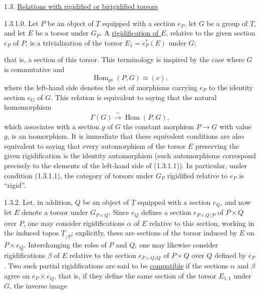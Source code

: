 
1.3. \underline{Relations with rigidified or birigidified torsors}

1.3.1.0. Let $P$ be an object of $\underline T$ equipped with a section
$e_P$, let $G$ be a group of $\underline T$, and let $E$ be a torsor
under $G_P$. A \underline{rigidification of $E$}, relative to the given
section $e_P$ of $P$, is a trivialization of the torsor
$E_1=e_P^*(E)$ under $G$;


that is, a section of this torsor. This terminology is inspired by the
case where $G$ is commutative and
\begin{equation}\tag{1.3.1.1}
 \operatorname{Hom}_{\mathrm{pt}}(P,G)\simeq(e),
\end{equation}
where the left-hand side denotes the set of morphisms carrying $e_P$ to
the identity section $e_G$ of $G$. This relation is equivalent to saying
that the natural homomorphism
\begin{equation}\tag{1.3.1.2}
 \Gamma(G)\xrightarrow{\ \sim\ }\operatorname{Hom}(P,G),
\end{equation}
which associates with a section $g$ of $G$ the constant morphism
$P\longrightarrow G$ with value $g$, is an isomorphism. It is immediate
that these equivalent conditions are also equivalent to saying that
every automorphism of the torsor $E$ preserving the given
rigidification is the identity automorphism (such automorphisms
correspond precisely to the elements of the left-hand side of
(1.3.1.1)). In particular, under condition (1.3.1.1), the category of
torsors under $G_P$ rigidified relative to $e_P$ is ``rigid''.

1.3.2. Let, in addition, $Q$ be an object of $\underline T$ equipped
with a section $e_Q$, and now let $E$ denote a torsor under
$G_{P\times Q}$. Since $e_Q$ defines a section
$e_{P\times Q/P}$ of $P\times Q$ over $P$, one may consider
rigidifications $\alpha$ of $E$ relative to this section, working in the
induced topos $\underline T_{/P}$; explicitly, these are sections of the
torsor induced by $E$ on $P\times e_Q$. Interchanging the roles of $P$
and $Q$, one may likewise consider rigidifications $\beta$ of $E$
relative to the section $e_{P\times Q/Q}$ of $P\times Q$ over $Q$
defined by $e_P$. Two such partial rigidifications are said to be
\underline{compatible} if the sections $\alpha$ and $\beta$ agree on
$e_P\times e_Q$, that is, if they define the same section of the torsor
$E_{1,1}$ under $G$, the inverse image

